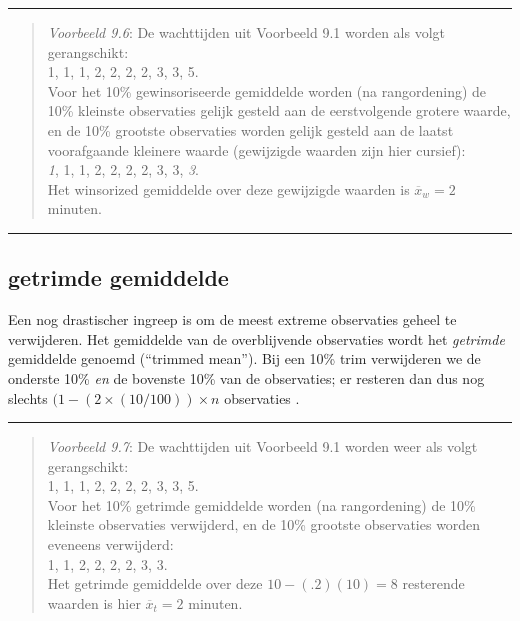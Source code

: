 \documentclass[
]{book}
\begin{document}
\begin{center}\rule{0.5\linewidth}{0.5pt}\end{center}

\begin{quote}
\emph{Voorbeeld 9.6}: De wachttijden uit Voorbeeld 9.1
worden als volgt gerangschikt:\\
1, 1, 1, 2, 2, 2, 2, 3, 3, 5.\\
Voor het 10\% gewinsoriseerde gemiddelde worden (na rangordening) de 10\%
kleinste observaties gelijk gesteld aan de eerstvolgende grotere waarde,
en de 10\% grootste observaties worden gelijk gesteld aan de laatst
voorafgaande kleinere waarde (gewijzigde waarden zijn hier cursief):\\
\emph{1}, 1, 1, 2, 2, 2, 2, 3, 3, \emph{3}.\\
Het winsorized gemiddelde over deze gewijzigde waarden is
\(\overline{x}_w=2\) minuten.
\end{quote}

\begin{center}\rule{0.5\linewidth}{0.5pt}\end{center}

\hypertarget{getrimde-gemiddelde}{%
\subsection{getrimde gemiddelde}\label{getrimde-gemiddelde}}

Een nog drastischer ingreep is om de meest extreme observaties geheel te
verwijderen. Het gemiddelde van de overblijvende observaties wordt het
\emph{getrimde} gemiddelde genoemd (``trimmed mean''). Bij een 10\% trim
verwijderen we de onderste 10\% \emph{en} de bovenste 10\% van de observaties;
er resteren dan dus nog slechts \((1- (2 \times (10/100))\times n\)
observaties \citep{Wilcox12}.

\begin{center}\rule{0.5\linewidth}{0.5pt}\end{center}

\begin{quote}
\emph{Voorbeeld 9.7}: De wachttijden uit Voorbeeld 9.1
worden weer als volgt gerangschikt:\\
1, 1, 1, 2, 2, 2, 2, 3, 3, 5.\\
Voor het 10\% getrimde gemiddelde worden (na rangordening) de 10\%
kleinste observaties verwijderd, en de 10\% grootste observaties worden
eveneens verwijderd:\\
1, 1, 2, 2, 2, 2, 3, 3.\\
Het getrimde gemiddelde over deze \(10-(.2)(10)=8\) resterende waarden is
hier \(\overline{x}_t=2\) minuten.
\end{quote}
\end{document}

